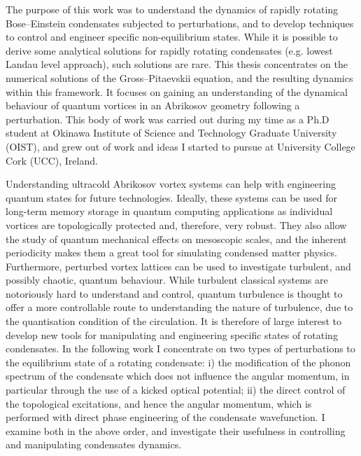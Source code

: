 
The purpose of this work was to understand the dynamics of rapidly rotating Bose--Einstein condensates subjected to perturbations, and to develop techniques to control and engineer specific non-equilibrium states. While it is possible to derive some analytical solutions for rapidly rotating condensates (e.g. lowest Landau level approach), such solutions are rare. This thesis concentrates on the numerical solutions of the Gross--Pitaevskii equation, and the resulting dynamics within this framework. It focuses on gaining an understanding of the dynamical behaviour of quantum vortices in an Abrikosov geometry following a perturbation. %
This body of work was carried out during my time as a Ph.D student at Okinawa Institute of Science and Technology Graduate University (OIST), and grew out of work and ideas I started to pursue at University College Cork (UCC), Ireland.

Understanding ultracold Abrikosov vortex systems can help with engineering quantum states for future technologies. Ideally, these systems can be used for long-term memory storage in quantum computing applications as individual vortices are topologically protected and, therefore, very robust. They also allow the study of quantum mechanical effects on mesoscopic scales, and the inherent periodicity makes them a great tool for simulating condensed matter physics. Furthermore, perturbed vortex lattices can be used to investigate turbulent, and possibly chaotic, quantum behaviour. While turbulent classical systems are notoriously hard to understand and control, quantum turbulence is thought to offer a more controllable route to understanding the nature of turbulence, due to the quantisation condition of the circulation. It is therefore of large interest to develop new tools for manipulating and engineering specific states of rotating condensates. In the following work I concentrate on two types of perturbations to the equilibrium state of a rotating condensate: i) the modification of the phonon spectrum of the condensate which does not influence the angular momentum, in particular through the use of a kicked optical potential; ii) the direct control of the topological excitations, and hence the angular momentum, which is performed with direct phase engineering of the condensate wavefunction. I examine both in the above order, and investigate their usefulness in controlling and manipulating condensates dynamics.

